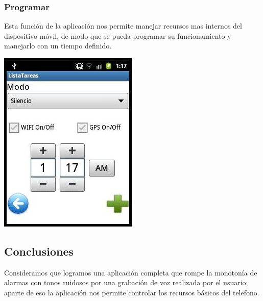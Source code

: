\documentclass[10pt]{article}
\begin{document}
{\begin{flushleft}
\newpage
\subsubsection{Programar}
Esta funci\'on de la aplicaci\'on nos permite manejar recursos mas internos del dispositivo m\'ovil, de modo que se pueda programar su funcionamiento y manejarlo con un tiempo definido.\\

\begin{center}
\vspace{0.4in}
\includegraphics[scale=0.8]{Programar1.jpg}
\end{center}

\newpage
\subsection{Conclusiones}
Consideramos que logramos una aplicaci\'on completa que rompe la monoton\'ia de alarmas con tonos ruidosos
por una grabaci\'on de voz realizada por el usuario; aparte de eso la aplicaci\'on nos permite controlar los recursos 
b\'asicos del telefono.

\end{flushleft}}
\end{document}
